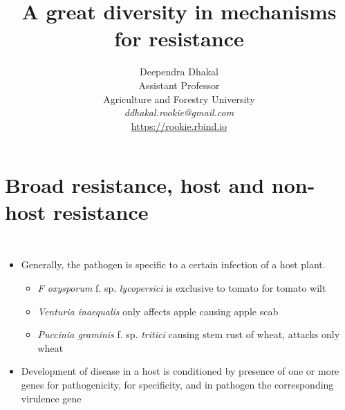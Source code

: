 \documentclass[11pt,dvipsnames,ignorenonframetext,aspectratio=169]{beamer}
\title[]{A great diversity in mechanisms for resistance}
\author[
        \vspace{-0.5cm}Deependra Dhakal\\
Assistant Professor\\
Agriculture and Forestry University\\
\textit{ddhakal.rookie@gmail.com}\\
\url{https://rookie.rbind.io}
    ]{\vspace{-0.5cm}Deependra Dhakal\\
Assistant Professor\\
Agriculture and Forestry University\\
\textit{ddhakal.rookie@gmail.com}\\
\url{https://rookie.rbind.io}}
\date[
      
  ]{
    }
\begin{document}
  \begin{frame}[plain]
  \titlepage
  \end{frame}



\hypertarget{broad-resistance-host-and-non-host-resistance}{%
\section{Broad resistance, host and non-host
resistance}\label{broad-resistance-host-and-non-host-resistance}}

\begin{frame}{}
\protect\hypertarget{section}{}
\begin{columns}[T, onlytextwidth]
\begin{itemize}
\small
\item Generally, the pathogen is specific to a certain infection of a host plant.
  \begin{itemize}
  \footnotesize
  \item \textit{F oxysporum} f. sp. \textit{lycopersici} is exclusive to tomato for tomato wilt
  \item \textit{Venturia inaequalis} only affects apple causing apple scab
  \item \textit{Puccinia graminis} f. sp. \textit{tritici} causing stem rust of wheat, attacks only wheat
  \end{itemize}
\item Development of disease in a host is conditioned by presence of one or more genes for pathogenicity, for specificity, and in pathogen the corresponding virulence gene
\end{itemize}



\end{columns}
\end{frame}
\end{document}

